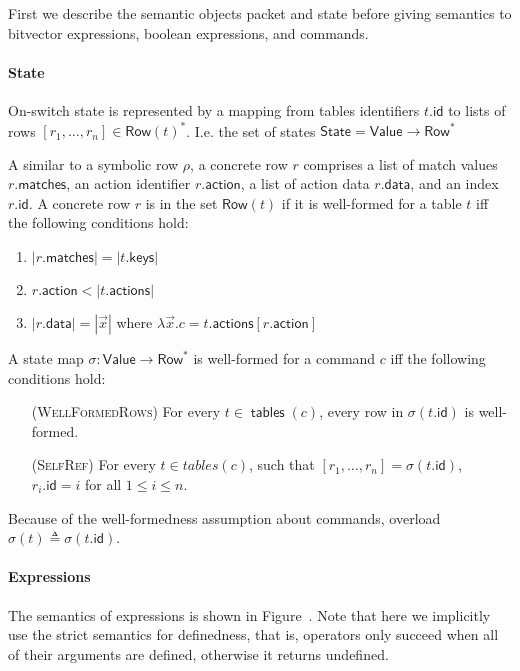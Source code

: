 \documentclass{article}
\newcommand{\Value}{\mathsf{Value}}
\newcommand{\Row}{\mathsf{Row}}
\newcommand{\State}{\mathsf{State}}
\newcommand{\matches}{\mathsf{matches}}
\newcommand{\action}{\mathsf{action}}
\newcommand{\actions}{\mathsf{actions}}
\newcommand{\keys}{\mathsf{keys}}
\newcommand{\data}{\mathsf{data}}
\newcommand{\id}{\mathsf{id}}
\newcommand{\tables}{\mathop{\mathsf{tables}}}
\theoremstyle{plain}
\theoremstyle{definition}
\theoremstyle{remark}
\begin{document}
First we describe the semantic objects packet and state before giving semantics
to bitvector expressions, boolean expressions, and commands.


\paragraph{State}
On-switch state is represented by a mapping from tables identifiers $t.\id$ to
lists of rows $[r_1,\ldots,r_n] \in \Row(t)^*$. I.e. the set of states $\State =
\Value \to \Row^*$

A similar to a symbolic row $\rho$, a concrete row $r$ comprises a list of match
values $r.\matches$, an action identifier $r.\action$, a list of action data
$r.\data$, and an index $r.\id$. A concrete row $r$ is in the set $\Row(t)$ if
it is well-formed for a table $t$ iff the following conditions hold:
\begin{enumerate}
\item $|r.\matches| = |t.\keys|$
\item $r.\action < |t.\actions|$
\item $|r.\data| = |\vec x|$ where $\lambda \vec x. c = t.\actions[r.\action]$
\end{enumerate}

A state map $\sigma : \Value \to \Row^*$ is well-formed for a command $c$ iff
the following conditions hold:
\begin{enumerate}[align=left]
\item[(\textsc{WellFormedRows})] For every $t\in \tables(c)$, every row in $\sigma(t.\id)$ is well-formed.
\item[(\textsc{SelfRef})] For every $t \in tables(c)$, such that $[r_1,\ldots,
  r_n] = \sigma(t.\id)$, $r_i.\id = i$ for all $1 \leq i \leq n$.
\end{enumerate}

Because of the well-formedness assumption about commands, overload $\sigma(t)
\triangleq \sigma(t.\id)$.

\paragraph{Expressions}
The semantics of expressions is shown in Figure~\label{fig:sem-expr}. Note that
here we implicitly use the strict semantics for definedness, that is, operators
only succeed when all of their arguments are defined, otherwise it returns
undefined.
\end{document}
